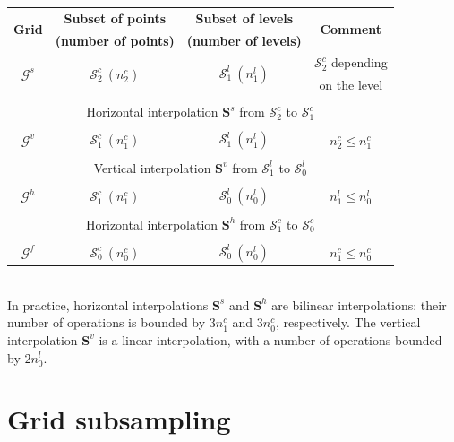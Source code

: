 \documentclass[12pt]{scrartcl}
\begin{document}
\begin{center}
\begin{tabular}{c|c|c|c}
\multirow{2}{*}{\textbf{Grid}} & \textbf{Subset of points} & \textbf{Subset of levels} & \multirow{2}{*}{\textbf{Comment}}\\
 & \textbf{(number of points)} & \textbf{(number of levels)} & \\
\hline
\hline
\multirow{2}{*}{$\mathcal{G}^s$} & \multirow{2}{*}{$\mathcal{S}^c_2 \ (n^c_2)$} & \multirow{2}{*}{$\mathcal{S}^l_1 \ (n^l_1)$} & $\mathcal{S}^c_2$ depending  \\
&  &  & on the level \\
\hline
\multicolumn{4}{c}{}\\[-1em]
\multicolumn{4}{c}{Horizontal interpolation $\mathbf{S}^s$ from $\mathcal{S}^c_2$ to $\mathcal{S}^c_1$} \\
\multicolumn{4}{c}{}\\[-1em]
\hline
$\mathcal{G}^v$ & $\mathcal{S}^c_1 \ (n^c_1)$ & $\mathcal{S}^l_1 \ (n^l_1)$ & $n^c_2 \le n^c_1$ \\[0.25em]
\hline
\multicolumn{4}{c}{}\\[-1em]
\multicolumn{4}{c}{Vertical interpolation $\mathbf{S}^v$ from $\mathcal{S}^l_1$ to $\mathcal{S}^l_0$} \\
\multicolumn{4}{c}{}\\[-1em]
\hline
$\mathcal{G}^h$ & $\mathcal{S}^c_1 \ (n^c_1)$ & $\mathcal{S}^l_0 \ (n^l_0)$ & $n^l_1 \le n^l_0$ \\[0.25em]
\hline
\multicolumn{4}{c}{}\\[-1em]
\multicolumn{4}{c}{Horizontal interpolation $\mathbf{S}^h$ from $\mathcal{S}^c_1$ to $\mathcal{S}^c_0$} \\
\multicolumn{4}{c}{}\\[-1em]
\hline
$\mathcal{G}^f$ & $\mathcal{S}^c_0 \ (n^c_0)$ & $\mathcal{S}^l_0 \ (n^l_0)$ & $n^c_1 \le n^c_0$ \\[0.25em]
\hline
\hline
\end{tabular}
\end{center}
$  $\\
In practice, horizontal interpolations $\mathbf{S}^s$ and $\mathbf{S}^h$ are bilinear interpolations: their number of operations is bounded by $3n^c_1$ and $3n^c_0$, respectively. The vertical interpolation $\mathbf{S}^v$ is a linear interpolation, with a number of operations bounded by $2n^l_0$.

\section{Grid subsampling}
\end{document}
